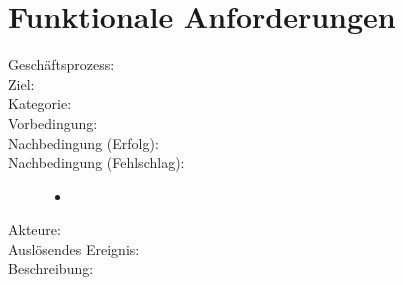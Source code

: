\chapter{Funktionale Anforderungen}


\begin{description}[itemsep=13pt,parsep=13pt]

\item[/FA10/]
	\begin{description}
	\item[Geschäftsprozess:] 
	\item[Ziel:] 
	\item[Kategorie:] 
	\item[Vorbedingung:] 
	\item[Nachbedingung (Erfolg):]
	\item[Nachbedingung (Fehlschlag):]
		\begin{itemize}
			\item 			
		\end{itemize}
	\item[Akteure:]
	\item[Auslösendes Ereignis:] 
	\item[Beschreibung:] 	
	\end{description}	
		
		
\end{description}	
